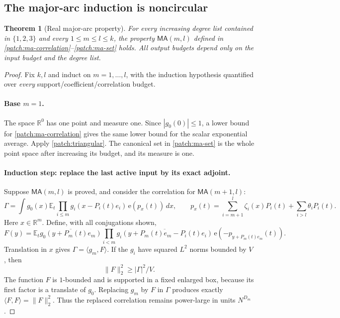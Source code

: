 \documentclass[11pt]{article}
\newtheorem{theorem}{Theorem}[section]
\theoremstyle{definition}
\newcommand{\ee}[1]{\mathrm e\!\left(#1\right)}
\begin{document}
\subsection{The major-arc induction is noncircular}\label{patch:major-induction}
\begin{theorem}[Real major-arc property]\label{patch:major-arc}
For every increasing degree list contained in $\{1,2,3\}$ and every $1\leq m\leq l\leq k$,
the property $\mathsf{MA}(m,l)$ defined in \eqref{patch:ma-correlation}--\eqref{patch:ma-set}
holds.  All output budgets depend only on the input budget and the degree list.
\end{theorem}
\begin{proof}
Fix $k,l$ and induct on $m=1,\ldots,l$, with the induction hypothesis quantified over
\emph{every} support/coefficient/correlation budget.

\paragraph{Base $m=1$.}
The space $\mathbb R^0$ has one point and measure one.  Since $|g_0(0)|\leq1$, a lower
bound for \eqref{patch:ma-correlation} gives the same lower bound for the scalar exponential
average.  Apply \cref{patch:triangular}.  The canonical set in \eqref{patch:ma-set} is the
whole point space after increasing its budget, and its measure is one.

\paragraph{Induction step: replace the last active input by its exact adjoint.}
Suppose $\mathsf{MA}(m,l)$ is proved, and consider the correlation for $\mathsf{MA}(m+1,l)$:
\[
 \Gamma=\int g_0(x)\mathbb E_t\prod_{i\leq m}g_i(x-P_i(t)e_i)\,
          \ee{p_x(t)}\,dx,\qquad
 p_x(t)=\sum_{i=m+1}^l\zeta_i(x)P_i(t)+\sum_{i>l}\theta_iP_i(t).
\]
Here $x\in\mathbb R^m$.  Define, with all conjugations shown,
\begin{equation}\label{patch:ma-adjoint}
 F(y)=\mathbb E_t\overline{g_0(y+P_m(t)e_m)}
     \prod_{i<m}\overline{g_i(y+P_m(t)e_m-P_i(t)e_i)}\,
               \ee{-p_{y+P_m(t)e_m}(t)}.
\end{equation}
Translation in $x$ gives $\Gamma=\langle g_m,F\rangle$.
If the $g_i$ have squared $L^2$ norms bounded by $V$, then
\[
 \|F\|_2^2\geq |\Gamma|^2/V.
\]
The function $F$ is $1$-bounded and is supported in a fixed enlarged box, because its first
factor is a translate of $g_0$.  Replacing $g_m$ by $F$ in $\Gamma$ produces exactly
$\langle F,F\rangle=\|F\|_2^2$.  Thus the replaced correlation remains power-large in
units $N^{D_m}$.


\end{proof}
\end{document}
